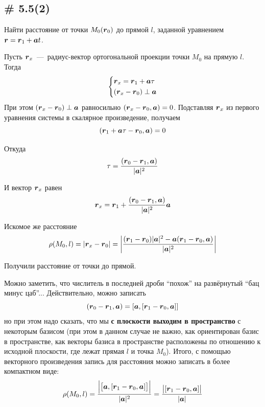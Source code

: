 \documentclass[a4paper,12pt]{article}
\begin{document}
  
  \subsection{\# 5.5(2)}
  
  \begin{problem}
    Найти расстояние от точки $M_0(\boldsymbol r_0)$ до прямой $l$, заданной уравнением $\bds r \hm= \bds r_1 \hm+ \bds a t$.
  \end{problem}
  
  \begin{solution}
    Пусть $\boldsymbol r_x$~---~радиус-вектор ортогональной проекции точки $M_0$ на прямую $l$.
    Тогда
    \[
      \left\{
        \begin{aligned}
          &\boldsymbol r_x = \boldsymbol r_1 + \boldsymbol a \tau\\
          &(\boldsymbol r_x - \boldsymbol r_0) \perp \boldsymbol a
        \end{aligned}
      \right.
    \]
    При этом $(\bds r_x \hm- \bds r_0) \hm\perp \bds a$ равносильно $(\bds r_x \hm- \bds r_0, \bds a) \hm= 0$.
    Подставляя $\boldsymbol r_x$ из первого уравнения системы в скалярное произведение, получаем
    \[
      (\boldsymbol r_1 + \boldsymbol a \tau - \boldsymbol r_0, \boldsymbol a) = 0
    \]
    
    Откуда
    \[
      \tau = \frac{(\boldsymbol r_0 - \boldsymbol r_1, \boldsymbol a)}{|\boldsymbol a|^2}
    \]
    
    И вектор $\boldsymbol r_x$ равен
    \[
      \boldsymbol r_x = \boldsymbol r_1 + \frac{(\boldsymbol r_0 - \boldsymbol r_1, \boldsymbol a)}{|\boldsymbol a|^2} \boldsymbol a
    \]
    
    Искомое же расстояние
    \[
      \rho(M_0, l) = |\boldsymbol r_x - \boldsymbol r_0|
      = \left|\frac{(\boldsymbol r_1 - \boldsymbol r_0)|\boldsymbol a|^2 - \boldsymbol a (\boldsymbol r_1 - \boldsymbol r_0, \boldsymbol a)}{|\boldsymbol a|^2}\right|
    \]
    
    Получили расстояние от точки до прямой.
    
    Можно заметить, что числитель в последней дроби ``похож'' на развёрнутый ``бац минус цаб''...
    Действительно, можно записать
    \[
      (\boldsymbol r_0 - \boldsymbol r_1, \boldsymbol a) = [\boldsymbol a, [\boldsymbol r_1 - \boldsymbol r_0, \boldsymbol a]]
    \]
    но при этом надо сказать, что мы \textbf{с плоскости выходим в пространство} с некоторым базисом (при этом в данном случае не важно, как ориентирован базис в пространстве, как векторы базиса в пространстве расположены по отношению к исходной плоскости, где лежат прямая $l$ и точка $M_0$).
    Итого, с помощью векторного произведения запись для расстояния можно записать в более компактном виде:
    \[
      \rho(M_0, l) = \frac{\Bigl|\bigl[\boldsymbol a, [\boldsymbol r_1 - \boldsymbol r_0, \boldsymbol a]\bigr]\Bigr|}{|\boldsymbol a|^2}
      = \frac{\bigl|[\boldsymbol r_1 - \boldsymbol r_0, \boldsymbol a]\bigr|}{|\boldsymbol a|}
    \]
  \end{solution}
  
\end{document}
